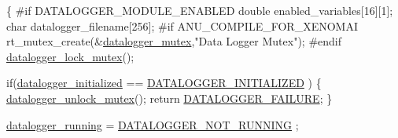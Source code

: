 \begin{DoxyCode}
\{
\textcolor{preprocessor}{    #if DATALOGGER\_MODULE\_ENABLED}
\textcolor{preprocessor}{}    \textcolor{keywordtype}{double} enabled\_variables[16][1];
    \textcolor{keywordtype}{char} datalogger\_filename[256];
\textcolor{preprocessor}{        #if ANU\_COMPILE\_FOR\_XENOMAI}
\textcolor{preprocessor}{}    rt\_mutex\_create(&\hyperlink{datalogger_01_07Caio-PC's_01conflicted_01copy_012012-11-23_08_8c_a824d6f7fd1d3898ba0b1100ba37875c6}{datalogger\_mutex},\textcolor{stringliteral}{"Data Logger Mutex"});
\textcolor{preprocessor}{        #endif}
\textcolor{preprocessor}{}    \hyperlink{datalogger_01_07Caio-PC's_01conflicted_01copy_012012-11-23_08_8c_a54b06d9395b2e370a5a72beb7f9524b2}{datalogger\_lock\_mutex}();

    \textcolor{keywordflow}{if}(\hyperlink{datalogger_01_07Caio-PC's_01conflicted_01copy_012012-11-23_08_8c_a35e8fbe04b90452afdc3c1be16ff6187}{datalogger\_initialized} == \hyperlink{datalogger_01_07Caio-PC's_01conflicted_01copy_012012-11-23_08_8h_a684c343d340004b77ca2b782934c96ca}{DATALOGGER\_INITIALIZED}
      )
    \{
        \hyperlink{datalogger_01_07Caio-PC's_01conflicted_01copy_012012-11-23_08_8c_a85453211c0c809083c36cc56b275aeeb}{datalogger\_unlock\_mutex}();
        \textcolor{keywordflow}{return} \hyperlink{datalogger_01_07Caio-PC's_01conflicted_01copy_012012-11-23_08_8h_ac52138ca42979f6e1f1d589020ff9f83}{DATALOGGER\_FAILURE};
    \}

    \hyperlink{datalogger_01_07Caio-PC's_01conflicted_01copy_012012-11-23_08_8c_a185c3ede96449d14f330fe5ac664e799}{datalogger\_running} = \hyperlink{datalogger_01_07Caio-PC's_01conflicted_01copy_012012-11-23_08_8h_a1a224da36800f52f56f30619849f7f5d}{DATALOGGER\_NOT\_RUNNING}
      ;


\end{DoxyCode}
